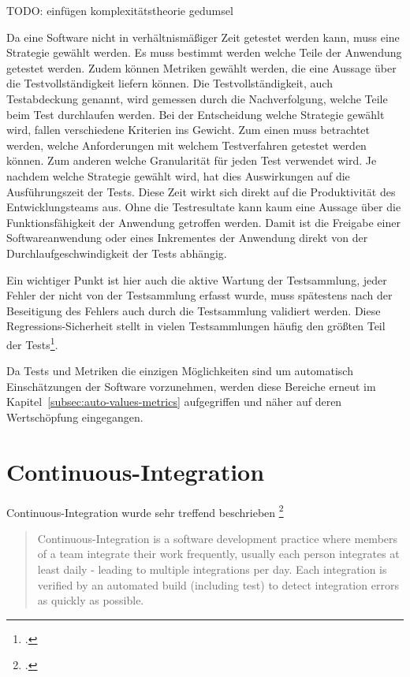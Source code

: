 TODO: einfügen komplexitätstheorie gedumsel

Da eine Software nicht in verhältnismäßiger Zeit getestet werden kann, muss eine Strategie gewählt werden. Es muss 
bestimmt werden welche Teile der Anwendung getestet werden. Zudem können Metriken gewählt werden, die eine Aussage über 
die Testvollständigkeit liefern können. Die Testvollständigkeit, auch Testabdeckung genannt, wird gemessen durch die 
Nachverfolgung, welche Teile beim Test durchlaufen werden. Bei der Entscheidung welche Strategie gewählt wird, fallen 
verschiedene Kriterien ins Gewicht. Zum einen muss betrachtet werden, welche Anforderungen mit welchem Testverfahren 
getestet werden können. Zum anderen welche Granularität für jeden Test verwendet wird.
Je nachdem welche Strategie gewählt wird, hat dies Auswirkungen auf die Ausführungszeit der Tests. Diese Zeit wirkt sich 
direkt auf die Produktivität des Entwicklungsteams aus. Ohne die Testresultate kann kaum eine Aussage über die 
Funktionsfähigkeit der Anwendung getroffen werden. Damit ist die Freigabe einer Softwareanwendung oder eines Inkrementes 
der Anwendung direkt von der Durchlaufgeschwindigkeit der Tests abhängig.

Ein wichtiger Punkt ist hier auch die aktive Wartung der Testsammlung, jeder Fehler der nicht von der Testsammlung 
erfasst wurde, muss spätestens nach der Beseitigung des Fehlers auch durch die Testsammlung validiert werden. Diese 
Regressions-Sicherheit stellt in vielen Testsammlungen häufig den größten Teil der Tests\footcite{software-quality2008}.

Da Tests und Metriken die einzigen Möglichkeiten sind um automatisch Einschätzungen der Software vorzunehmen, werden 
diese Bereiche erneut im Kapitel~\ref{subsec:auto-values-metrics} aufgegriffen und näher auf deren Wertschöpfung 
eingegangen.

\section{Continuous-Integration}

Continuous-Integration wurde sehr treffend beschrieben \footcite{fowler2006}

\blockquote {Continuous-Integration is a software development practice where members of a team integrate their work 
frequently, usually each person integrates at least daily - leading to multiple integrations per day. Each integration is 
verified by an automated build (including test) to detect integration errors as quickly as possible.}

